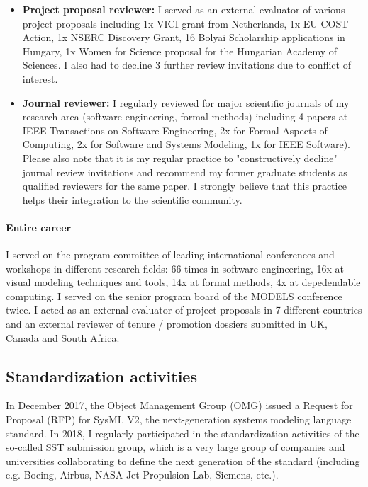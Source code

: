 \begin{itemize}[leftmargin=0.5cm]
\item \textbf{Project proposal reviewer:}
I served as an external evaluator of various project proposals including 1x VICI grant from Netherlands, 1x EU COST Action, 1x NSERC Discovery Grant, 16 Bolyai Scholarship applications in Hungary, 1x Women for Science proposal for the Hungarian Academy of Sciences. I also had to decline 3 further review invitations due to conflict of interest.

\item \textbf{Journal reviewer:}
I regularly reviewed for major scientific journals of my research area (software engineering, formal methods) including 4 papers at IEEE Transactions on Software Engineering, 2x for Formal Aspects of Computing, 2x for Software and Systems Modeling, 1x for IEEE Software). Please also note that it is my regular practice to "constructively decline" journal review invitations and recommend my former graduate students as qualified reviewers for the same paper. I strongly believe that this practice helps their integration to the scientific community. 
\end{itemize}

\paragraph{Entire career}
I served on the program committee of leading international conferences and workshops in different research fields: 66 times in software engineering, 16x at visual modeling techniques and tools, 14x at formal methods, 4x at depedendable computing. I served on the senior program board of the MODELS conference twice. I acted as an external evaluator of project proposals in 7 different countries and an external reviewer of tenure / promotion dossiers submitted in UK, Canada and South Africa. 

\subsection{Standardization activities}
In December 2017, the Object Management Group (OMG) issued a Request for Proposal (RFP) for SysML V2, the next-generation systems modeling language standard. In 2018, I regularly participated in the standardization activities of the so-called SST submission group, which is a very large group of companies and universities collaborating to define the next generation of the standard (including e.g. Boeing, Airbus, NASA Jet Propulsion Lab, Siemens, etc.).

